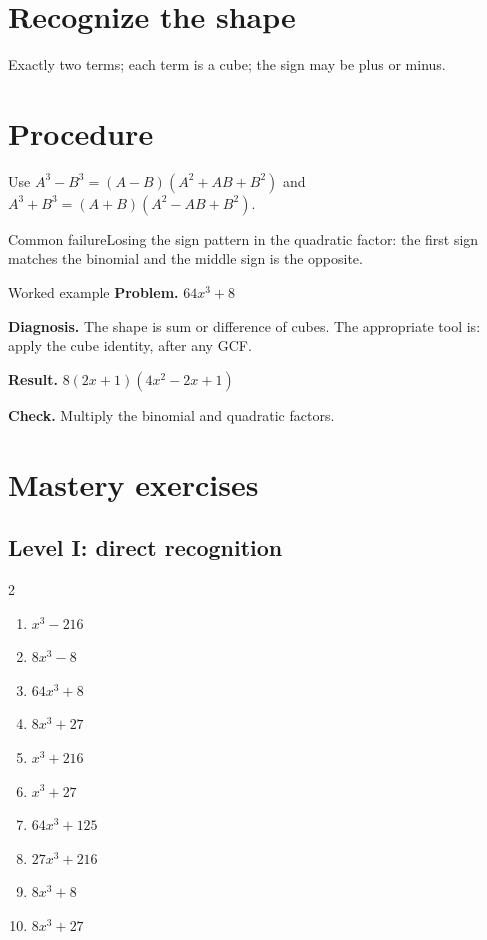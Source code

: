 \documentclass[11pt,oneside]{book}
\begin{document}
\section{Recognize the shape}
Exactly two terms; each term is a cube; the sign may be plus or minus.
\section{Procedure}
Use $A^3-B^3=(A-B)(A^2+AB+B^2)$ and $A^3+B^3=(A+B)(A^2-AB+B^2)$.

\begin{warningbox}{Common failure}Losing the sign pattern in the quadratic factor: the first sign matches the binomial and the middle sign is the opposite.\end{warningbox}
\begin{examplebox}{Worked example}
\textbf{Problem.} $ 64 x^{3} + 8 $

\textbf{Diagnosis.} The shape is sum or difference of cubes. The appropriate tool is: apply the cube identity, after any GCF.

\textbf{Result.} $ 8 \left(2 x + 1\right) \left(4 x^{2} - 2 x + 1\right) $

\textbf{Check.} Multiply the binomial and quadratic factors.
\end{examplebox}
\section{Mastery exercises}
\subsection*{Level I: direct recognition}
\begin{multicols}{2}
\begin{enumerate}[leftmargin=*,label=\textbf{\arabic*.},itemsep=0.65\baselineskip]
\item $ x^{3} - 216 $
\item $ 8 x^{3} - 8 $
\item $ 64 x^{3} + 8 $
\item $ 8 x^{3} + 27 $
\item $ x^{3} + 216 $
\item $ x^{3} + 27 $
\item $ 64 x^{3} + 125 $
\item $ 27 x^{3} + 216 $
\item $ 8 x^{3} + 8 $
\item $ 8 x^{3} + 27 $
\end{enumerate}
\end{multicols}
\end{document}

